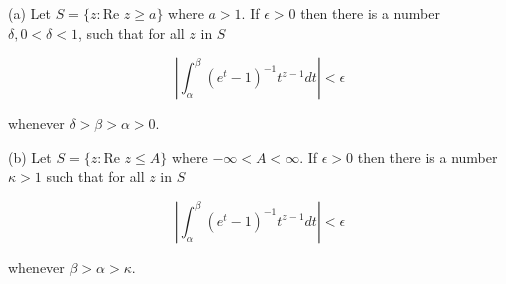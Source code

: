 (a) Let $S = \{z: \text{Re } z \geq a\}$ where $a > 1$. If $\epsilon > 0$ then there is a number $\delta, 0 < \delta < 1$, such that for all $z$ in $S$

$$\left| \int_\alpha^\beta (e^t - 1)^{-1} t^{z-1} dt \right| < \epsilon$$

whenever $\delta > \beta > \alpha > 0$.

(b) Let $S = \{z: \text{Re } z \leq A\}$ where $-\infty < A < \infty$. If $\epsilon > 0$ then there is a number $\kappa > 1$ such that for all $z$ in $S$

$$\left| \int_\alpha^\beta (e^t - 1)^{-1} t^{z-1} dt \right| < \epsilon$$

whenever $\beta > \alpha > \kappa$.